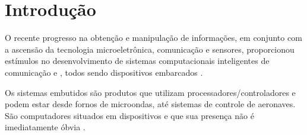 \section{Introdução} \label{chap:introducao}

	O recente progresso na obtenção e manipulação de informações, em conjunto com a ascensão da tecnologia microeletrônica, comunicação e sensores, proporcionou estímulos no desenvolvimento de sistemas computacionais inteligentes de comunicação e \wearables, todos sendo dispositivos embarcados \cite{Jozwiak2017}.

	Os sistemas embutidos são produtos que utilizam processadores/controladores e podem estar desde fornos de microondas, até sistemas de controle de aeronaves.
   São computadores situados em dispositivos e que sua presença não é imediatamente óbvia \cite{Wolf1994}.

